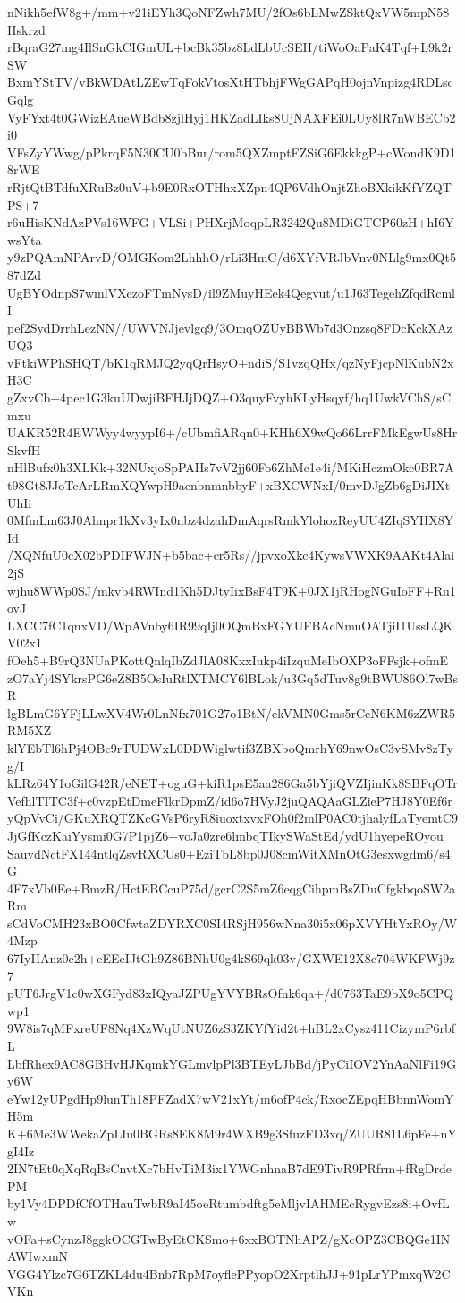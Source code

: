 nNikh5efW8g+/mm+v21iEYh3QoNFZwh7MU/2fOs6bLMwZSktQxVW5mpN58Hskrzd
rBqraG27mg4IlSnGkCIGmUL+bcBk35bz8LdLbUcSEH/tiWoOaPaK4Tqf+L9k2rSW
BxmYStTV/vBkWDAtLZEwTqFokVtosXtHTbhjFWgGAPqH0ojnVnpizg4RDLscGqlg
VyFYxt4t0GWizEAueWBdb8zjlHyj1HKZadLIks8UjNAXFEi0LUy8lR7nWBECb2i0
VFsZyYWwg/pPkrqF5N30CU0bBur/rom5QXZmptFZSiG6EkkkgP+cWondK9D18rWE
rRjtQtBTdfuXRuBz0uV+b9E0RxOTHhxXZpn4QP6VdhOnjtZhoBXkikKfYZQTPS+7
r6uHisKNdAzPVs16WFG+VLSi+PHXrjMoqpLR3242Qu8MDiGTCP60zH+hI6YwsYta
y9zPQAmNPArvD/OMGKom2LhhhO/rLi3HmC/d6XYfVRJbVnv0NLlg9mx0Qt587dZd
UgBYOdnpS7wmlVXezoFTmNysD/il9ZMuyHEek4Qegvut/u1J63TegehZfqdRcmlI
pef2SydDrrhLezNN//UWVNJjevlgq9/3OmqOZUyBBWb7d3Onzsq8FDcKckXAzUQ3
vFtkiWPhSHQT/bK1qRMJQ2yqQrHsyO+ndiS/S1vzqQHx/qzNyFjcpNlKubN2xH3C
gZxvCb+4pec1G3kuUDwjiBFHJjDQZ+O3quyFvyhKLyHsqyf/hq1UwkVChS/sCmxu
UAKR52R4EWWyy4wyypI6+/cUbmfiARqn0+KHh6X9wQo66LrrFMkEgwUs8HrSkvfH
nHlBufx0h3XLKk+32NUxjoSpPAIIs7vV2jj60Fo6ZhMc1e4i/MKiHczmOkc0BR7A
t98Gt8JJoTcArLRmXQYwpH9acnbnmnbbyF+xBXCWNxI/0mvDJgZb6gDiJIXtUhIi
0MfmLm63J0Ahnpr1kXv3yIx0nbz4dzahDmAqrsRmkYlohozReyUU4ZIqSYHX8YId
/XQNfuU0cX02bPDIFWJN+b5bac+cr5Rs//jpvxoXkc4KywsVWXK9AAKt4Alai2jS
wjhu8WWp0SJ/mkvb4RWInd1Kh5DJtyIixBsF4T9K+0JX1jRHogNGuIoFF+Ru1ovJ
LXCC7fC1qnxVD/WpAVnby6IR99qIj0OQmBxFGYUFBAcNmuOATjiI1UssLQKV02x1
fOeh5+B9rQ3NUaPKottQnlqIbZdJlA08KxxIukp4iIzquMeIbOXP3oFFsjk+ofmE
zO7aYj4SYkrsPG6eZ8B5OsIuRtlXTMCY6lBLok/u3Gq5dTuv8g9tBWU86Ol7wBsR
lgBLmG6YFjLLwXV4Wr0LnNfx701G27o1BtN/ekVMN0Gms5rCeN6KM6zZWR5RM5XZ
klYEbTl6hPj4OBc9rTUDWxL0DDWiglwtif3ZBXboQmrhY69nwOsC3vSMv8zTyg/I
kLRz64Y1oGilG42R/eNET+oguG+kiR1psE5aa286Ga5bYjiQVZIjinKk8SBFqOTr
VefhlTITC3f+c0vzpEtDmeFlkrDpmZ/id6o7HVyJ2juQAQAaGLZieP7HJ8Y0Ef6r
yQpVvCi/GKuXRQTZKcGVsP6ryR8iuoxtxvxFOh0f2mlP0AC0tjhalyfLaTyemtC9
JjGfKczKaiYysmi0G7P1pjZ6+voJa0zre6lmbqTIkySWaStEd/ydU1hyepeROyou
SauvdNctFX144ntlqZsvRXCUs0+EziTbL8bp0J08cmWitXMnOtG3esxwgdm6/s4G
4F7xVb0Ee+BmzR/HctEBCcuP75d/gcrC2S5mZ6eqgCihpmBsZDuCfgkbqoSW2aRm
sCdVoCMH23xBO0CfwtaZDYRXC0SI4RSjH956wNna30i5x06pXVYHtYxROy/W4Mzp
67IyIIAnz0c2h+eEEeIJtGh9Z86BNhU0g4kS69qk03v/GXWE12X8c704WKFWj9z7
pUT6JrgV1c0wXGFyd83xIQyaJZPUgYVYBRsOfnk6qa+/d0763TaE9bX9o5CPQwp1
9W8is7qMFxreUF8Nq4XzWqUtNUZ6zS3ZKYfYid2t+hBL2xCysz411CizymP6rbfL
LbfRhex9AC8GBHvHJKqmkYGLmvlpPl3BTEyLJbBd/jPyCiIOV2YnAaNlFi19Gy6W
eYw12yUPgdHp9lunTh18PFZadX7wV21xYt/m6ofP4ck/RxocZEpqHBbnnWomYH5m
K+6Me3WWekaZpLIu0BGRs8EK8M9r4WXB9g3SfuzFD3xq/ZUUR81L6pFe+nYgI4Iz
2IN7tEt0qXqRqBsCnvtXc7bHvTiM3ix1YWGnhnaB7dE9TivR9PRfrm+fRgDrdePM
by1Vy4DPDfCfOTHauTwbR9aI45oeRtumbdftg5eMljvIAHMEcRygvEzs8i+OvfLw
vOFa+sCynzJ8ggkOCGTwByEtCKSmo+6xxBOTNhAPZ/gXcOPZ3CBQGe1INAWIwxmN
VGG4Ylzc7G6TZKL4du4Bnb7RpM7oyflePPyopO2XrptlhJJ+91pLrYPmxqW2CVKn
